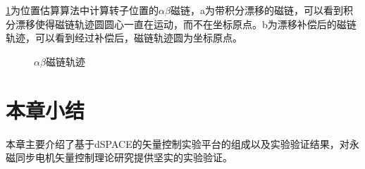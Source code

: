 \ref{fig:ab_flux}为位置估算算法中计算转子位置的$\alpha\beta$磁链，a为带积分漂移的磁链，可以看到积分漂移使得磁链轨迹圆圆心一直在运动，而不在坐标原点。b为漂移补偿后的磁链轨迹，可以看到经过补偿后，磁链轨迹圆为坐标原点。
\begin{figure} [h]
	\centering%
	\hspace{2em}%
	\caption{$\alpha\beta$磁链轨迹}\label{fig:ab_flux}
\end{figure}
\section{本章小结}
本章主要介绍了基于dSPACE的矢量控制实验平台的组成以及实验验证结果，对永磁同步电机矢量控制理论研究提供坚实的实验验证。